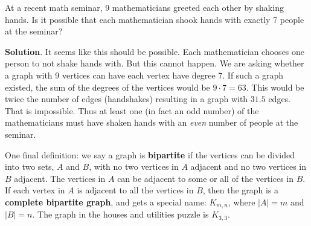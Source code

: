 \documentclass[11pt,]{book}
\newcommand{\terminology}[1]{\textbf{#1}}
\theoremstyle{ptxplainnotitle}
\theoremstyle{ptxplaintitle}
\theoremstyle{ptxdefinitionnotitle}
\theoremstyle{ptxdefinitiontitle}
\theoremstyle{ptxdefinitionnotitle}
\theoremstyle{ptxdefinitiontitle}
\theoremstyle{ptxdefinitionnotitle}
\theoremstyle{ptxdefinitiontitle}
\theoremstyle{ptxdefinitiontitlenonumber}
\theoremstyle{ptxdefinitiontitlenonumber}
\numberwithin{equation}{chapter}
\begin{document}
\begin{example}\label{example-79}
\hypertarget{p-2603}{}%
At a recent math seminar, 9 mathematicians greeted each other by shaking hands. Is it possible that each mathematician shook hands with exactly 7 people at the seminar?%
\par\smallskip%
\noindent\textbf{Solution}.\hypertarget{solution-268}{}\quad%
\hypertarget{p-2604}{}%
It seems like this should be possible. Each mathematician chooses one person to not shake hands with. But this cannot happen. We are asking whether a graph with 9 vertices can have each vertex have degree 7. If such a graph existed, the sum of the degrees of the vertices would be \(9\cdot 7 = 63\). This would be twice the number of edges (handshakes) resulting in a graph with \(31.5\) edges. That is impossible. Thus at least one (in fact an odd number) of the mathematicians must have shaken hands with an \emph{even} number of people at the seminar.%
\end{example}
\hypertarget{p-2605}{}%
One final definition: we say a graph is \terminology{bipartite} if the vertices can be divided into two sets, \(A\) and \(B\), with no two vertices in \(A\) adjacent and no two vertices in \(B\) adjacent. The vertices in \(A\) can be adjacent to some or all of the vertices in \(B\). If each vertex in \(A\) is adjacent to all the vertices in \(B\), then the graph is a \terminology{complete bipartite graph}, and gets a special name: \(K_{m,n}\), where \(|A| = m\) and \(|B| = n\). The graph in the houses and utilities puzzle is \(K_{3,3}\).%
\typeout{************************************************}
\typeout{************************************************}
\end{document}
